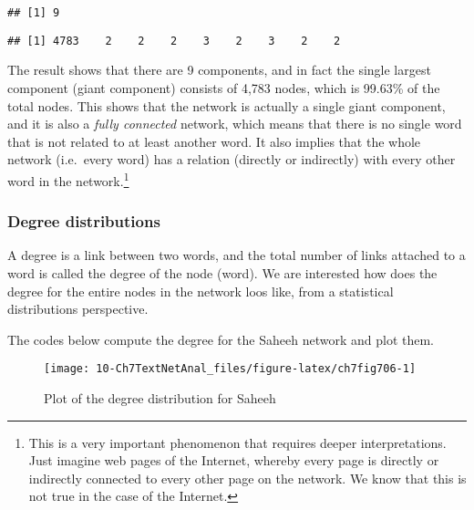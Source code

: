 \documentclass[
]{article}
\newenvironment{Shaded}{\begin{snugshade}}{\end{snugshade}}
\newcommand{\NormalTok}[1]{#1}
\newcommand{\SpecialCharTok}[1]{\textcolor[rgb]{0.81,0.36,0.00}{\textbf{#1}}}
\begin{document}
\begin{verbatim}
## [1] 9
\end{verbatim}

\begin{Shaded}
\end{Shaded}

\begin{verbatim}
## [1] 4783    2    2    2    3    2    3    2    2
\end{verbatim}

\normalsize

The result shows that there are 9 components, and in fact the single largest component (giant component) consists of 4,783 nodes, which is 99.63\% of the total nodes. This shows that the network is actually a single giant component, and it is also a \emph{fully connected} network, which means that there is no single word that is not related to at least another word. It also implies that the whole network (i.e.~every word) has a relation (directly or indirectly) with every other word in the network.\footnote{This is a very important phenomenon that requires deeper interpretations. Just imagine web pages of the Internet, whereby every page is directly or indirectly connected to every other page on the network. We know that this is not true in the case of the Internet.}

\hypertarget{degree-distributions-1}{%
\subsubsection{Degree distributions}\label{degree-distributions-1}}

A degree is a link between two words, and the total number of links attached to a word is called the degree of the node (word). We are interested how does the degree for the entire nodes in the network loos like, from a statistical distributions perspective.

The codes below compute the degree for the Saheeh network and plot them.

\begin{figure}

{\centering \texttt{[image: 10-Ch7TextNetAnal\_files/figure-latex/ch7fig706-1]} 

}

\caption{Plot of the degree distribution for Saheeh}\label{fig:ch7fig706}
\end{figure}
\end{document}

